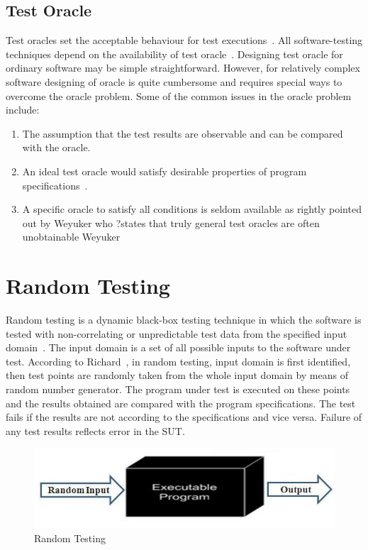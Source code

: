 \subsection{Test Oracle}
Test oracles set the acceptable behaviour for test executions~\cite{baresi2001test}. All software-testing techniques depend on the availability of test oracle~\cite{gaudel2010software}. Designing test oracle for ordinary software may be simple straightforward. However, for relatively complex software designing of oracle is quite cumbersome and requires special ways to overcome the oracle problem. Some of the common issues in the oracle problem include:
\begin{enumerate}
\item The assumption that the test results are observable and can be compared with the oracle.
\item An ideal test oracle would satisfy desirable properties of program specifications~\cite{baresi2001test}.
\item A specific oracle to satisfy all conditions is seldom available as rightly pointed out by Weyuker who ?states that truly general test oracles are often unobtainable Weyuker~\cite{weyuker1982testing} 
\end{enumerate}



\section{Random Testing}
Random testing is a dynamic black-box testing technique in which the software is tested with non-correlating or unpredictable test data from the specified input domain~\cite{Chan2002}. The input domain is a set of all possible inputs to the software under test. According to Richard~\cite{hamlet1994}, in random testing, input domain is first identified, then test points are randomly taken from the whole input domain by means of random number generator. The program under test is executed on these points and the results obtained are compared with the program specifications. The test fails if the results are not according to the specifications and vice versa. Failure of any test results reflects error in the SUT.
\begin{figure}[h]
	\centering
	\includegraphics[scale=0.5]{Literature/randomTesting.jpg}
	\caption{Random Testing}
\end{figure}

